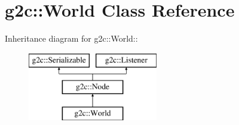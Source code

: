 \hypertarget{classg2c_1_1_world}{
\section{g2c::World Class Reference}
\label{classg2c_1_1_world}
}
Inheritance diagram for g2c::World::\begin{figure}[H]
\begin{center}
\leavevmode
\includegraphics[height=3cm]{classg2c_1_1_world}
\end{center}
\end{figure}
